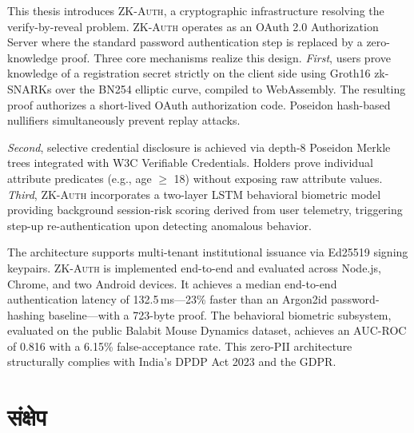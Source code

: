 \documentclass[12pt,a4paper,oneside]{report}
\begin{document}
This thesis introduces \textsc{ZK-Auth}, a cryptographic infrastructure resolving the verify-by-reveal problem. \textsc{ZK-Auth} operates as an OAuth 2.0 Authorization Server where the standard password authentication step is replaced by a zero-knowledge proof. Three core mechanisms realize this design. \textit{First}, users prove knowledge of a registration secret strictly on the client side using Groth16 zk-SNARKs over the BN254 elliptic curve, compiled to WebAssembly. The resulting proof authorizes a short-lived OAuth authorization code. Poseidon hash-based nullifiers simultaneously prevent replay attacks.

\textit{Second}, selective credential disclosure is achieved via depth-8 Poseidon Merkle trees integrated with W3C Verifiable Credentials. Holders prove individual attribute predicates (e.g., age $\geq$ 18) without exposing raw attribute values. \textit{Third}, \textsc{ZK-Auth} incorporates a two-layer LSTM behavioral biometric model providing background session-risk scoring derived from user telemetry, triggering step-up re-authentication upon detecting anomalous behavior.

The architecture supports multi-tenant institutional issuance via Ed25519 signing keypairs. \textsc{ZK-Auth} is implemented end-to-end and evaluated across Node.js, Chrome, and two Android devices. It achieves a median end-to-end authentication latency of 132.5\,ms---23\% faster than an Argon2id password-hashing baseline---with a 723-byte proof. The behavioral biometric subsystem, evaluated on the public Balabit Mouse Dynamics dataset, achieves an AUC-ROC of 0.816 with a 6.15\% false-acceptance rate. This zero-PII architecture structurally complies with India's DPDP Act 2023 and the GDPR.

\clearpage
\chapter*{\texthindi{संक्षेप}}
\end{document}

